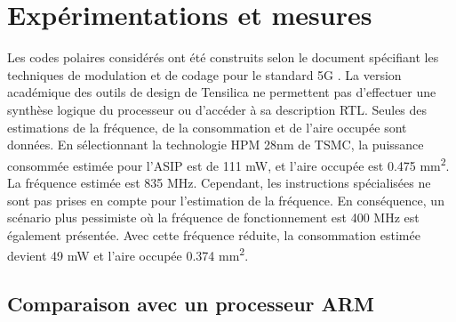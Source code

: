 \section{Expérimentations et mesures}
\label{sec:tensilica_res}


Les codes polaires considérés ont été construits selon le document spécifiant les techniques de modulation et de codage pour le standard 5G \cite{3gpp_ts_2017-1}. 
La version académique des outils de design de Tensilica ne permettent pas d'effectuer une synthèse logique du processeur ou d'accéder à sa description RTL. Seules des estimations de la fréquence, de la consommation et de l'aire occupée sont données. En sélectionnant la technologie HPM 28nm de TSMC, la puissance consommée estimée pour l'ASIP est de 111 mW, et l'aire occupée est 0.475 mm\textsuperscript{2}. La fréquence estimée est 835 MHz. Cependant, les instructions spécialisées ne sont pas prises en compte pour l'estimation de la fréquence. En conséquence, un scénario plus pessimiste où la fréquence de fonctionnement est 400 MHz est également présentée. Avec cette fréquence réduite, la consommation estimée devient 49 mW et l'aire occupée 0.374 mm\textsuperscript{2}.

\subsection{Comparaison avec un processeur ARM}



